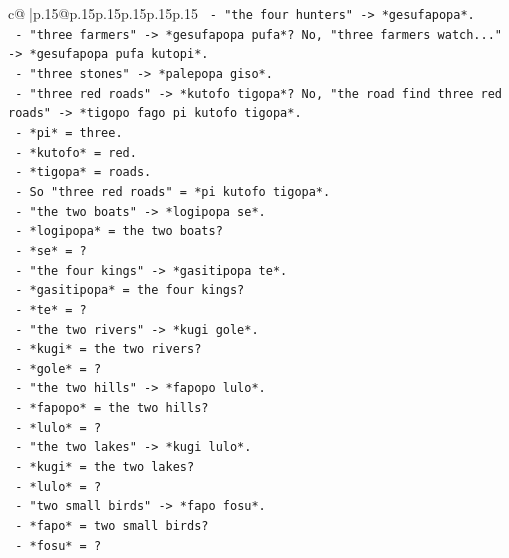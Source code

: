 \documentclass{article}
\begin{document}
{\begin{supertabular}{c@{$\;$}|p{.15\linewidth}@{}p{.15\linewidth}p{.15\linewidth}p{.15\linewidth}p{.15\linewidth}p{.15\linewidth}}
{{{\texttt{            {-} "the four hunters" {-}> *gesufapopa*.} \\
\texttt{            {-} "three farmers" {-}> *gesufapopa pufa*? No, "three farmers watch..." {-}> *gesufapopa pufa kutopi*.} \\
\texttt{            {-} "three stones" {-}> *palepopa giso*.} \\
\texttt{            {-} "three red roads" {-}> *kutofo tigopa*? No, "the road find three red roads" {-}> *tigopo fago pi kutofo tigopa*.} \\
\texttt{              {-} *pi* = three.} \\
\texttt{              {-} *kutofo* = red.} \\
\texttt{              {-} *tigopa* = roads.} \\
\texttt{              {-} So "three red roads" = *pi kutofo tigopa*.} \\
\texttt{            {-} "the two boats" {-}> *logipopa se*.} \\
\texttt{              {-} *logipopa* = the two boats?} \\
\texttt{              {-} *se* = ?} \\
\texttt{            {-} "the four kings" {-}> *gasitipopa te*.} \\
\texttt{              {-} *gasitipopa* = the four kings?} \\
\texttt{              {-} *te* = ?} \\
\texttt{            {-} "the two rivers" {-}> *kugi gole*.} \\
\texttt{              {-} *kugi* = the two rivers?} \\
\texttt{              {-} *gole* = ?} \\
\texttt{            {-} "the two hills" {-}> *fapopo lulo*.} \\
\texttt{              {-} *fapopo* = the two hills?} \\
\texttt{              {-} *lulo* = ?} \\
\texttt{            {-} "the two lakes" {-}> *kugi lulo*.} \\
\texttt{              {-} *kugi* = the two lakes?} \\
\texttt{              {-} *lulo* = ?} \\
\texttt{            {-} "two small birds" {-}> *fapo fosu*.} \\
\texttt{              {-} *fapo* = two small birds?} \\
\texttt{              {-} *fosu* = ?} \\
}}}
\end{supertabular}}
\end{document}
